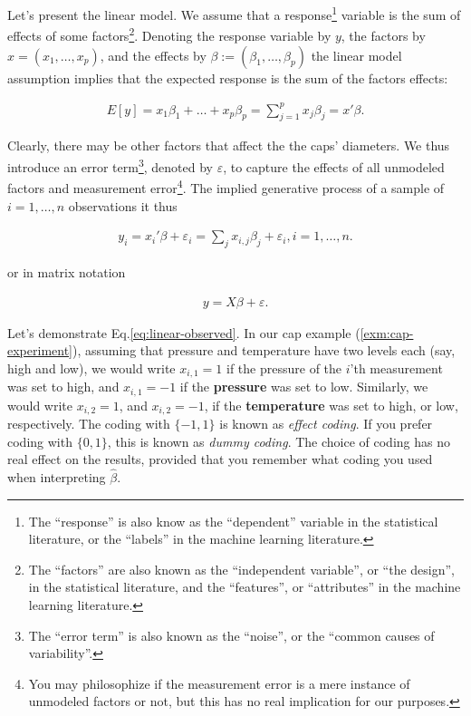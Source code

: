 \documentclass[]{book}
\theoremstyle{definition}
\theoremstyle{definition}
\theoremstyle{definition}
\theoremstyle{remark}
\begin{document}
Let's present the linear model. We assume that a response\footnote{The
  ``response'' is also know as the ``dependent'' variable in the
  statistical literature, or the ``labels'' in the machine learning
  literature.} variable is the sum of effects of some factors\footnote{The
  ``factors'' are also known as the ``independent variable'', or ``the
  design'', in the statistical literature, and the ``features'', or
  ``attributes'' in the machine learning literature.}. Denoting the
response variable by \(y\), the factors by \(x=(x_1,\dots,x_p)\), and
the effects by \(\beta:=(\beta_1,\dots,\beta_p)\) the linear model
assumption implies that the expected response is the sum of the factors
effects:

\begin{align}
  E[y]=x_1 \beta_1 + \dots + x_p \beta_p = \sum_{j=1}^p x_j \beta_j = x'\beta .
  \label{eq:linear-mean}
\end{align}

Clearly, there may be other factors that affect the the caps' diameters.
We thus introduce an error term\footnote{The ``error term'' is also
  known as the ``noise'', or the ``common causes of variability''.},
denoted by \(\varepsilon\), to capture the effects of all unmodeled
factors and measurement error\footnote{You may philosophize if the
  measurement error is a mere instance of unmodeled factors or not, but
  this has no real implication for our purposes.}. The implied
generative process of a sample of \(i=1,\dots,n\) observations it thus

\begin{align}
  y_i = x_i'\beta + \varepsilon_i = \sum_j x_{i,j} \beta_j + \varepsilon_i , i=1,\dots,n .
  \label{eq:linear-observed}
\end{align}

or in matrix notation

\begin{align}
  y = X \beta + \varepsilon .
  \label{eq:linear-matrix}
\end{align}

Let's demonstrate Eq.\eqref{eq:linear-observed}. In our cap example
(\ref{exm:cap-experiment}), assuming that pressure and temperature have
two levels each (say, high and low), we would write \(x_{i,1}=1\) if the
pressure of the \(i\)'th measurement was set to high, and \(x_{i,1}=-1\)
if the \textbf{pressure} was set to low. Similarly, we would write
\(x_{i,2}=1\), and \(x_{i,2}=-1\), if the \textbf{temperature} was set
to high, or low, respectively. The coding with \(\{-1,1\}\) is known as
\emph{effect coding}. If you prefer coding with \(\{0,1\}\), this is
known as \emph{dummy coding}. The choice of coding has no real effect on
the results, provided that you remember what coding you used when
interpreting \(\hat \beta\).
\end{document}
